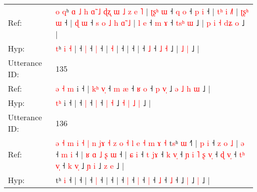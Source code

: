 \documentclass[10pt]{article}
\DeclareRobustCommand{\hl}[1]{{\textcolor{red}{#1}}}
\begin{document}
\begin{longtable}{ll}
Ref: & \hl{o}\hl{ }\hl{q}ʰ\hl{ }\hl{ɑ}\hl{ }\hl{˩}\hl{ }\hl{h}\hl{ }\hl{ɑ}\hl{̃}\hl{ }\hl{˩}\hl{ }\hl{ɖ}\hl{ʐ}\hl{ }\hl{ɯ}\hl{ }\hl{˩}\hl{ }\hl{z} \hl{e} \hl{˥} |\hl{ }\hl{ʈ}\hl{ʂ}\hl{ʰ}\hl{ }\hl{ɯ} ˧\hl{ }\hl{q} \hl{o} ˧\hl{ }\hl{p} \hl{i} ˧ |\hl{ }\hl{t}\hl{ʰ}\hl{ }\hl{i} \hl{˩}\hl{˥} |\hl{ }\hl{ʈ}\hl{ʂ}\hl{ʰ}\hl{ }\hl{ɯ} ˧ |\hl{ }\hl{ɖ}\hl{ }\hl{ɯ} ˧\hl{ }\hl{s}\hl{ }\hl{o}\hl{ }\hl{˩}\hl{ }\hl{h}\hl{ }\hl{ɑ}\hl{̃}\hl{ }\hl{˩} |\hl{ }\hl{l}\hl{ }\hl{e} ˧\hl{ }\hl{m} \hl{ɤ} ˧ \hl{t}\hl{s}\hl{ʰ} \hl{ɯ} ˩ |\hl{ }\hl{p}\hl{ }\hl{i}\hl{ }\hl{˧} \hl{d}\hl{ʑ} \hl{o} ˩ |
 \\
Hyp: & \hl{}\hl{}\hl{t}ʰ\hl{}\hl{}\hl{}\hl{}\hl{}\hl{}\hl{}\hl{}\hl{}\hl{}\hl{}\hl{}\hl{}\hl{}\hl{}\hl{}\hl{}\hl{}\hl{}\hl{} \hl{i} \hl{˧} |\hl{}\hl{}\hl{}\hl{}\hl{}\hl{} ˧\hl{}\hl{} \hl{|} ˧\hl{}\hl{} \hl{|} ˧ |\hl{}\hl{}\hl{}\hl{}\hl{} \hl{}\hl{˧} |\hl{}\hl{}\hl{}\hl{}\hl{}\hl{} ˧ |\hl{}\hl{}\hl{}\hl{} ˧\hl{}\hl{}\hl{}\hl{}\hl{}\hl{}\hl{}\hl{}\hl{}\hl{}\hl{}\hl{}\hl{} |\hl{}\hl{}\hl{}\hl{} ˧\hl{}\hl{} \hl{˩} ˧ \hl{}\hl{}\hl{˩} \hl{˧} ˩ |\hl{}\hl{}\hl{}\hl{}\hl{}\hl{} \hl{}\hl{˩} \hl{|} ˩ |
 \\
\midrule
Utterance ID: & 135 \\
Ref: & \hl{ə}\hl{ }\hl{˧}\hl{ }\hl{m} i ˧ |\hl{ }\hl{k}\hl{ʰ}\hl{ }\hl{v}\hl{̩} ˧\hl{ }\hl{m} \hl{æ} ˧\hl{ }\hl{ʁ} \hl{o} ˧ \hl{p} \hl{v}\hl{̩} ˩ \hl{ə} \hl{˩} \hl{h} \hl{ɯ} ˩ |
 \\
Hyp: & \hl{}\hl{}\hl{}\hl{t}\hl{ʰ} i ˧ |\hl{}\hl{}\hl{}\hl{}\hl{}\hl{} ˧\hl{}\hl{} \hl{|} ˧\hl{}\hl{} \hl{|} ˧ \hl{|} \hl{}\hl{˧} ˩ \hl{˧} \hl{|} \hl{˩} \hl{|} ˩ |
 \\
\midrule
Utterance ID: & 136 \\
Ref: & \hl{ə}\hl{ }\hl{˧}\hl{ }\hl{m}\hl{ }\hl{i}\hl{ }\hl{˧}\hl{ }\hl{|}\hl{ }\hl{n}\hl{ }\hl{j}\hl{ɤ}\hl{ }\hl{˧}\hl{ }\hl{z}\hl{ }\hl{o}\hl{ }\hl{˧}\hl{ }\hl{l}\hl{ }\hl{e}\hl{ }\hl{˧}\hl{ }\hl{m}\hl{ }\hl{ɤ}\hl{ }\hl{˧}\hl{ }t\hl{s}ʰ \hl{ɯ} ˧\hl{˥} |\hl{ }\hl{p}\hl{ }\hl{i} ˧\hl{ }\hl{z}\hl{ }\hl{o}\hl{ }\hl{˩} |\hl{ }\hl{ə} ˧\hl{ }\hl{m} \hl{i} ˧ |\hl{ }\hl{ʁ}\hl{ }\hl{ɑ}\hl{ }\hl{˩}\hl{ }\hl{ʂ}\hl{ }\hl{ɯ} ˧ |\hl{ }\hl{ɕ}\hl{ }\hl{i} ˧\hl{ }\hl{t} \hl{j}\hl{ɤ} ˧\hl{ }\hl{k} \hl{v}\hl{̩} ˧\hl{ }\hl{ɲ}\hl{ }\hl{i}\hl{ }\hl{˥}\hl{ }\hl{ʂ} \hl{v}\hl{̩} ˧\hl{ }\hl{ɖ} \hl{v}\hl{̩} ˧\hl{ }\hl{t}\hl{ʰ} \hl{v}\hl{̩} ˧\hl{ }\hl{k}\hl{ }\hl{v}\hl{̩} ˩\hl{ }\hl{ɲ} \hl{i} ˩\hl{ }\hl{z} \hl{e} ˩ |
 \\
Hyp: & \hl{}\hl{}\hl{}\hl{}\hl{}\hl{}\hl{}\hl{}\hl{}\hl{}\hl{}\hl{}\hl{}\hl{}\hl{}\hl{}\hl{}\hl{}\hl{}\hl{}\hl{}\hl{}\hl{}\hl{}\hl{}\hl{}\hl{}\hl{}\hl{}\hl{}\hl{}\hl{}\hl{}\hl{}\hl{}\hl{}\hl{}t\hl{}ʰ \hl{i} ˧\hl{} |\hl{}\hl{}\hl{}\hl{} ˧\hl{}\hl{}\hl{}\hl{}\hl{}\hl{} |\hl{}\hl{} ˧\hl{}\hl{} \hl{|} ˧ |\hl{}\hl{}\hl{}\hl{}\hl{}\hl{}\hl{}\hl{}\hl{}\hl{} ˧ |\hl{}\hl{}\hl{}\hl{} ˧\hl{}\hl{} \hl{}\hl{|} ˧\hl{}\hl{} \hl{}\hl{|} ˧\hl{}\hl{}\hl{}\hl{}\hl{}\hl{}\hl{}\hl{} \hl{}\hl{|} ˧\hl{}\hl{} \hl{}\hl{˩} ˧\hl{}\hl{}\hl{} \hl{}\hl{˩} ˧\hl{}\hl{}\hl{}\hl{}\hl{} ˩\hl{}\hl{} \hl{|} ˩\hl{}\hl{} \hl{|} ˩ |

\end{longtable}
\end{document}
